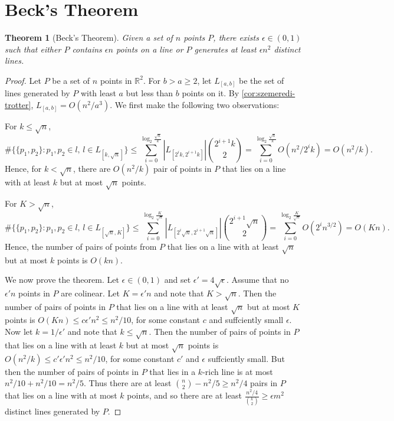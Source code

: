 \documentclass[10pt,reqno]{amsart}
\newtheorem{theorem}{Theorem}[section]
\theoremstyle{definition}
\theoremstyle{remark}
\renewcommand{\leq}{\leqslant}
\renewcommand{\geq}{\geqslant}
\def\R{\mathbb{R}}
\numberwithin{equation}{section}
\begin{document}
\newpage

\section{Beck's Theorem}

\begin{theorem}[Beck's Theorem]
	Given a set of $n$ points $P$, there exists $\epsilon \in (0, 1)$ such that either $P$ contains $\epsilon n$ points on a line or $P$ generates at least $\epsilon n^2$ distinct lines.
\end{theorem}

\begin{proof}
	Let $P$ be a set of $n$ points in $\R^2$. For $b > a \geq 2$, let $L_{[a, b]}$ be the set of lines generated by $P$ with least $a$ but less than $b$ points on it. By \cref{cor:szemeredi-trotter}, $L_{[a, b]} = O(n^2/a^3)$. We first make the following two observations:
	
	For $k \leq \sqrt{n}$,
	\[
		\#\{\{p_1, p_2\} : p_1, p_2 \in l, \, l \in L_{[k, \sqrt{n}]}\} \leq \sum_{i = 0}^{\log_2 \frac{\sqrt{n}}{k}} |L_{[2^ik, 2^{i + 1}k]}|\binom{2^{i + 1}k}{2} = \sum_{i = 0}^{\log_2 \frac{\sqrt{n}}{k}} O(n^2/2^{i}k) = O(n^2/k).
	\]
	Hence, for $k < \sqrt{n}$, there are $O(n^2/k)$ pair of points in $P$ that lies on a line with at least $k$ but at most $\sqrt{n}$ points. 
	
	For $K > \sqrt{n}$, 
	\[
		\#\{\{p_1, p_2\} : p_1, p_2 \in l, \, l \in L_{[\sqrt{n}, K]}\} \leq \sum_{i = 0}^{\log_2 \frac{K}{\sqrt{n}}} |L_{[2^i\sqrt{n}, 2^{i + 1}\sqrt{n}]}|\binom{2^{i + 1}\sqrt{n}}{2} = \sum_{i = 0}^{\log_2 \frac{K}{\sqrt{n}}} O(2^in^{3/2}) = O(Kn).
	\]
	Hence, the number of pairs of points from $P$ that lies on a line with at least $\sqrt{n}$ but at most $k$ points is $O(kn)$. 

	We now prove the theorem. Let $\epsilon \in (0, 1)$ and set $\epsilon' = 4\sqrt{\epsilon}$. Assume that no $\epsilon' n$ points in $P$ are colinear. Let $K = \epsilon'n$ and note that $K > \sqrt{n}$. Then the number of pairs of points in $P$ that lies on a line with at least $\sqrt{n}$ but at most $K$ points is $O(Kn) \leq c\epsilon' n^2 \leq n^2/10$, for some constant $c$ and suffciently small $\epsilon$. Now let $k = 1/\epsilon'$ and note that $k \leq \sqrt{n}$. Then the number of pairs of points in $P$ that lies on a line with at least $k$ but at most $\sqrt{n}$ points is $O(n^2/k) \leq c'\epsilon' n^2 \leq n^2/10$, for some constant $c'$ and $\epsilon$ suffciently small. But then the number of pairs of points in $P$ that lies in a $k$-rich line is at most $n^2/10 + n^2/10 = n^2/5$. Thus there are at least $\binom{n}{2} - n^2/5 \geq n^2/4$ pairs in $P$ that lies on a line with at most $k$ points, and so there are at least $\frac{n^2/4}{\binom{k}{2}} \geq \epsilon m^2$ distinct lines generated by $P$.
\end{proof}
\end{document}
